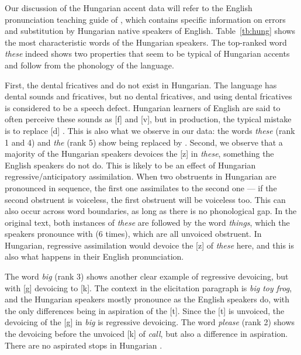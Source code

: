 \documentclass[output=paper]{LSP/langsci}
\begin{document}
Our discussion of the Hungarian accent data will refer to the English pronunciation teaching guide of \citet{nadasdy_background_2006}, which contains specific information on errors and substitution by Hungarian native speakers of English. Table~\ref{tb:hung} shows the most characteristic words of the Hungarian speakers. The top-ranked word \textit{these} indeed shows two properties that seem to be typical of Hungarian accents and follow from the phonology of the language.

First, the dental fricatives 
and 
do not exist in Hungarian. The language has dental sounds and fricatives, but no dental fricatives, and using dental fricatives is considered to be a speech defect. Hungarian learners of English are said to often perceive these sounds as [f] and [v], but in production, the typical mistake is to replace 
[d] \citep[p. 71]{nadasdy_background_2006}. This is also what we observe in our data: the words \textit{these} (rank 1 and 4) and \textit{the} (rank 5) show 
being replaced by 
. Second, we observe that a majority of the Hungarian speakers devoices the [z] in \textit{these}, something the English speakers do not do. This is likely to be an effect of Hungarian regressive/anticipatory assimilation. When two obstruents in Hungarian are pronounced in sequence, the first one assimilates to the second one --- if the second obstruent is voiceless, the first obstruent will be voiceless too. This can also occur across word boundaries, as long as there is no phonological gap. In the original text, both instances of \textit{these} are followed by the word \textit{things}, which the speakers pronounce with 
(6 times), which are all unvoiced obstruent. In Hungarian, regressive assimilation would devoice the [z] of \textit{these} here, and this is also what happens in their English pronunciation.

The word \textit{big} (rank 3) shows another clear example of regressive devoicing, but with [g] devoicing to [k]. The context in the elicitation paragraph is \textit{big toy frog}, and the Hungarian speakers mostly pronounce 
as the English speakers do, with the only differences being in aspiration of the [t]. Since the [t] is unvoiced, the devoicing of the [g] in \textit{big} is regressive devoicing. The word \textit{please} (rank 2) shows the devoicing before the unvoiced [k] of \textit{call}, but also a difference in aspiration. There are no aspirated stops in Hungarian \citep{petrova_voice_2006}.
\end{document}
